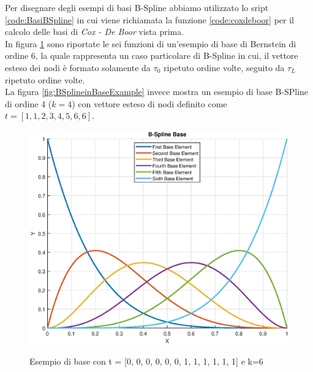 \documentclass[a4paper, 12pt]{article}
\begin{document}


Per disegnare degli esempi di basi B-Spline abbiamo utilizzato lo sript \ref{code:BasiBSpline} in cui viene richiamata la funzione \ref{code:coxdeboor} per il calcolo delle basi di \textit{Cox - De Boor} vista prima.\\
In figura \ref{fig:BernsteinBaseExample} sono riportate le sei funzioni di un'esempio di base di Bernstein di ordine 6, la quale rappresenta un caso particolare di B-Spline in cui, il vettore esteso dei nodi è formato solamente da $\tau_0$ ripetuto ordine volte, seguito da $\tau_L$ ripetuto ordine volte.\\
La figura \ref{fig:BSplineinBaseExample} invece mostra un esempio di base B-SPline di ordine 4 ($k = 4$) con vettore esteso di nodi definito come $t = [1, 1, 2, 3, 4, 5, 6, 6]$.



\begin{figure}[!]
	\centering
	\caption{Esempio di base con t = [0, 0, 0, 0, 0, 0, 1, 1, 1, 1, 1, 1] e k=6}
	\includegraphics[scale=0.55]{plot_bezier_base.eps}
	\label{fig:BernsteinBaseExample}
\end{figure}
\end{document}
